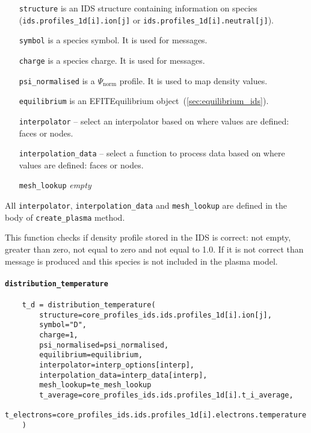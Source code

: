 \documentclass[../main.tex]{subfiles}
\begin{document}
\begin{itemize}[align=left]
    \item[\texttt{structure}] is an IDS structure containing information on species (\texttt{ids.profiles\_1d[i].ion[j]} or \texttt{ids.profiles\_1d[i].neutral[j]}).
    \item[\texttt{symbol}] is a species symbol. It is used for messages.
    \item[\texttt{charge}] is a species charge. It is used for messages.
    \item[\texttt{psi\_normalised}] is a $\Psi_\text{norm}$ profile. It is used to map density values.
    \item[\texttt{equilibrium}] is an EFITEquilibrium object~(\cref{sec:equilibrium_ids}).
    \item[\texttt{interpolator}] -- select an interpolator based on where values are defined: faces or nodes.
    \item[\texttt{interpolation\_data}] -- select a function to process data based on where values are defined: faces or nodes.
    \item[\texttt{mesh\_lookup}] \emph{empty}
\end{itemize}

All \texttt{interpolator}, \texttt{interpolation\_data} and \texttt{mesh\_lookup} are defined in the body of \texttt{create\_plasma} method.

This function checks if density profile stored in the IDS is correct: not empty, greater than zero, not equal to zero and not equal to 1.0. If it is not correct than message is produced and this species is not included in the plasma model.

\paragraph{\texttt{distribution\_temperature}}%
\label{par:distribution_temperature}

\begin{verbatim}
    t_d = distribution_temperature(
        structure=core_profiles_ids.ids.profiles_1d[i].ion[j],
        symbol="D",
        charge=1,
        psi_normalised=psi_normalised,
        equilibrium=equilibrium,
        interpolator=interp_options[interp],
        interpolation_data=interp_data[interp],
        mesh_lookup=te_mesh_lookup
        t_average=core_profiles_ids.ids.profiles_1d[i].t_i_average,
        t_electrons=core_profiles_ids.ids.profiles_1d[i].electrons.temperature
    )
\end{verbatim}
\end{document}
